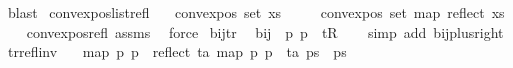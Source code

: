 \begin{isabellebody}
\ blast\isanewline
{}\isamarkupfalse%
%
\endisatagproof
{\isafoldproof}%
%
\isadelimproof
\isanewline
%
\endisadelimproof
\isanewline
{}\isamarkupfalse%
\ convex{\isacharunderscore}{\kern0pt}pos{\isacharunderscore}{\kern0pt}list{\isacharunderscore}{\kern0pt}refl{\isacharcolon}{\kern0pt}\isanewline
\ \ \ {\isachardoublequoteopen}convex{\isacharunderscore}{\kern0pt}pos\ {\isacharparenleft}{\kern0pt}set\ xs{\isacharparenright}{\kern0pt}{\isachardoublequoteclose}\isanewline
\ \ \ \ \ {\isachardoublequoteopen}convex{\isacharunderscore}{\kern0pt}pos\ {\isacharparenleft}{\kern0pt}set\ {\isacharparenleft}{\kern0pt}map\ reflect\ xs{\isacharparenright}{\kern0pt}{\isacharparenright}{\kern0pt}{\isachardoublequoteclose}\isanewline
%
\isadelimproof
\ \ %
\endisadelimproof
%
\isatagproof
{}\isamarkupfalse%
\ convex{\isacharunderscore}{\kern0pt}pos{\isacharunderscore}{\kern0pt}refl\ assms\ \isamarkupfalse%
\ force%
\endisatagproof
{\isafoldproof}%
%
\isadelimproof
\isanewline
%
\endisadelimproof
\isanewline
\isanewline
\isanewline
{}\isamarkupfalse%
\ bij{\isacharunderscore}{\kern0pt}tr{\isacharcolon}{\kern0pt}\isanewline
\ \ {\isachardoublequoteopen}bij\ {\isacharparenleft}{\kern0pt}{\isasymlambda}\ p{\isachardot}{\kern0pt}\ p\ {\isacharplus}{\kern0pt}\ {\isacharparenleft}{\kern0pt}t{\isacharcolon}{\kern0pt}{\isacharcolon}{\kern0pt}R{}{\isacharparenright}{\kern0pt}{\isacharparenright}{\kern0pt}{\isachardoublequoteclose}\isanewline
%
\isadelimproof
\ \ %
\endisadelimproof
%
\isatagproof
{}\isamarkupfalse%
\ {\isacharparenleft}{\kern0pt}simp\ add{\isacharcolon}{\kern0pt}\ bij{\isacharunderscore}{\kern0pt}plus{\isacharunderscore}{\kern0pt}right{\isacharparenright}{\kern0pt}%
\endisatagproof
{\isafoldproof}%
%
\isadelimproof
\isanewline
%
\endisadelimproof
\isanewline
{}\isamarkupfalse%
\ tr{\isacharunderscore}{\kern0pt}refl{\isacharunderscore}{\kern0pt}inv{\isacharcolon}{\kern0pt}\ \isanewline
\ \ {\isachardoublequoteopen}map\ {\isacharparenleft}{\kern0pt}{\isasymlambda}p{\isachardot}{\kern0pt}\ p\ {\isacharplus}{\kern0pt}\ reflect\ ta{\isacharparenright}{\kern0pt}\ {\isacharparenleft}{\kern0pt}map\ {\isacharparenleft}{\kern0pt}{\isasymlambda}p{\isachardot}{\kern0pt}\ p\ {\isacharplus}{\kern0pt}\ ta{\isacharparenright}{\kern0pt}\ ps{\isacharparenright}{\kern0pt}\ {\isacharequal}{\kern0pt}\ ps{\isachardoublequoteclose}\isanewline
%
\isadelimproof
\ \ %
\endisadelimproof
%
\isatagproof
{}\isamarkupfalse%

\end{isabellebody}
